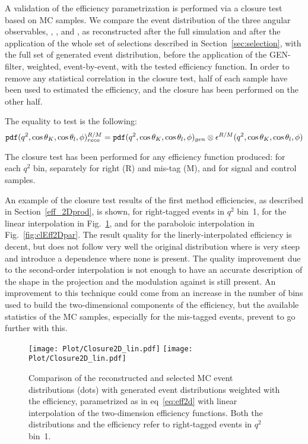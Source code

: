 A validation of the efficiency parametrization is performed via a closure test based on MC samples.
We compare the event distribution of the three angular observables, \cTK, \cTL, and \PHI, as reconstructed after the full simulation and after the application of the whole set of selections described in Section~\ref{sec:selection}, with the full set of generated event distribution, before the application of the GEN-filter, weighted, event-by-event, with the tested efficiency function.
In order to remove any statistical correlation in the closure test, half of each sample have been used to estimated the efficiency, and the closure has been performed on the other half.

The equality to test is the following:
\begin{equation}\label{eq:effClosure}
    \mathtt{pdf}(q^2,\cos\theta_K,\cos\theta_l,\phi)_{reco}^{R/M}=\mathtt{pdf}(q^2,\cos\theta_K,\cos\theta_l,\phi)_{gen}\otimes\epsilon^{R/M}(q^2,\cos\theta_K,\cos\theta_l,\phi)
\end{equation}

The closure test has been performed for any efficiency function produced: for each $q^2$ bin, separately for right (R) and mis-tag (M), and for signal and control samples.

An example of the closure test results of the first method efficiencies, as described in Section~\ref{eff_2Dprod}, is shown, for right-tagged events in $q^2$ bin~1, for the linear interpolation in Fig.~\ref{fig:clEff2Dlin}, and for the paraboloic interpolation in Fig.~\ref{fig:clEff2Dpar}.
The result quality for the linerly-interpolated efficiency is decent, but does not follow very well the original distribution where is very steep and introduce a \PHI dependence where none is present.
The quality improvement due to the second-order interpolation is not enough to have an accurate description of the shape in the \cTK projection and the modulation against \PHI is still present.
An improvement to this technique could come from an increase in the number of bins used to build the two-dimensional components of the efficiency, but the available statistics of the MC samples, especially for the mis-tagged events, prevent to go further with this.

\begin{figure}[hbt]
    \texttt{[image: Plot/Closure2D\_lin.pdf]}
    \texttt{[image: Plot/Closure2D\_lin.pdf]}
    \caption{Comparison of the reconstructed and selected MC event distributions (dots) with generated event distributions weighted with the efficiency, parametrized as in eq~\ref{eq:eff2d} with linear interpolation of the two-dimension efficiency functions. Both the distributions and the efficiency refer to right-tagged events in $q^2$ bin~1.}
    \label{fig:clEff2Dlin}
\end{figure}

